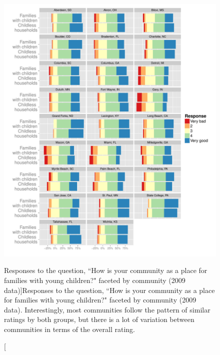 \documentclass[smallextended]{svjour3}\usepackage[]{graphicx}\usepackage[]{color}
\newenvironment{knitrout}{}{} %
\begin{document}
\begin{knitrout}
\color{fgcolor}\begin{figure}

{\centering \includegraphics[width=0.99\linewidth]{figure/kidPlot-1} 

}

\caption[Responses to the question, ``How is your community as a place for families with young children?" faceted by community (2009 data)]{Responses to the question, ``How is your community as a place for families with young children?" faceted by community (2009 data). Interestingly, most communities follow the pattern of similar ratings by both groups, but there is a lot of variation between communities in terms of the overall rating.}\label{fig:kidPlot}
\end{figure}


\end{knitrout}
\end{document}
